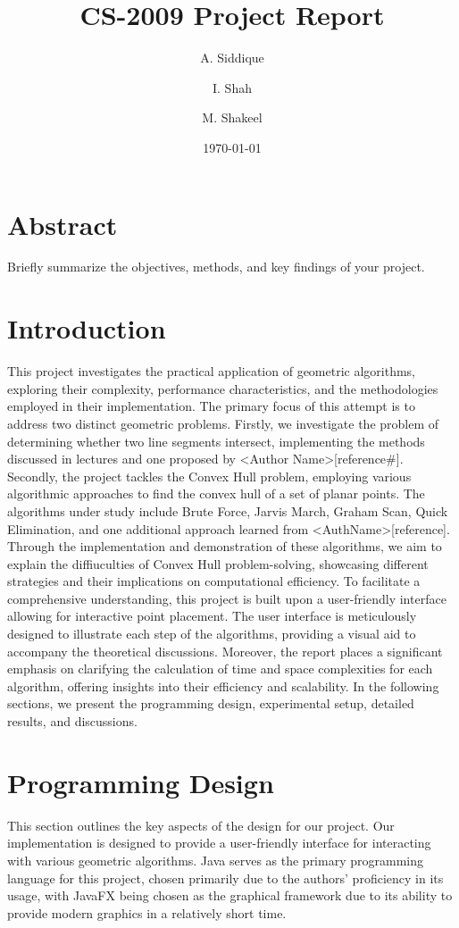 \documentclass[10pt,twocolumn]{article}
\title{CS-2009 Project Report}
\author{A. Siddique \and I. Shah \and M. Shakeel}
\date{\today}
\begin{document}
\maketitle

\section*{Abstract}
Briefly summarize the objectives, methods, and key findings of your project.

\section*{Introduction}
This project investigates the practical application of geometric algorithms,
exploring their complexity, performance characteristics, and the methodologies employed in their implementation.
The primary focus of this attempt is to address two distinct geometric problems. Firstly, we investigate the problem of
determining whether two line segments intersect, implementing the methods discussed in lectures and one proposed by <Author Name>[reference#].
Secondly, the project tackles the Convex Hull problem, employing various algorithmic approaches to find the convex hull of a set
of planar points. The algorithms under study include Brute Force, Jarvis March, Graham Scan, Quick Elimination, and one
additional approach learned from <AuthName>[reference]. Through the implementation and demonstration of these algorithms, we
aim to explain the diffiuculties of Convex Hull problem-solving, showcasing different strategies and their implications on computational efficiency.
To facilitate a comprehensive understanding, this project is built upon a user-friendly interface allowing for interactive point
placement. The user interface is meticulously designed to illustrate each step of the algorithms,
providing a visual aid to accompany the theoretical discussions. Moreover, the report places a significant emphasis on clarifying
the calculation of time and space complexities for each algorithm, offering insights into their efficiency and scalability.
In the following sections, we present the programming design, experimental setup, detailed results, and discussions.

\section*{Programming Design}

This section outlines the key aspects of the design for our project. Our implementation is designed to provide a user-friendly interface for 
interacting with various geometric algorithms. Java serves as the primary programming language for this project, 
chosen primarily due to the authors' proficiency in its usage, with JavaFX being chosen as the graphical framework due to its ability to provide
modern graphics in a relatively short time.
\end{document}
